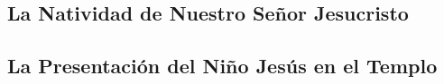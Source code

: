 \documentclass[a4paper,11pt]{article}
\begin{document}
      
      \medskip
      
      
      \medskip
      
      
      \medskip
      
      
      \medskip
            
    \subsection*{\hfil La Natividad de Nuestro Señor Jesucristo \hfil}
      
      
      \medskip
      
      
      \medskip
      
      
      \medskip
      
      
      \medskip
      
      
      \medskip

      
      \medskip
      
      
      \medskip

      
      \medskip
      
      
      \medskip
      
      

            
    \subsection*{\hfil La Presentación del Niño Jesús en el Templo \hfil}
      
      
      \medskip
      
      
      \medskip
      
      
      \medskip
      
\end{document}
